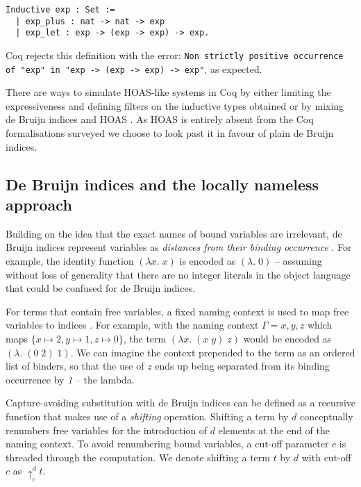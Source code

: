 \documentclass[]{unswthesis}
\begin{document}
\begin{verbatim}
Inductive exp : Set :=
  | exp_plus : nat -> nat -> exp
  | exp_let : exp -> (exp -> exp) -> exp.
\end{verbatim}

Coq rejects this definition with the error: \texttt{Non strictly positive occurrence of "exp" in
 "exp -> (exp -> exp) -> exp"}, as expected.
 
There are ways to simulate HOAS-like systems in Coq by either limiting the expressiveness and defining filters on the inductive types obtained \cite{despeyroux95} or by mixing de Bruijn indices and HOAS \cite{capretta07}. As HOAS is entirely absent from the Coq formalisations surveyed we choose to look past it in favour of plain de Bruijn indices.

\subsection{De Bruijn indices and the locally nameless approach}
\label{sec:de_bruijn}

Building on the idea that the exact names of bound variables are irrelevant, de Bruijn indices represent variables as \textit{distances from their binding occurrence} \cite{deBruijn72}. For example, the identity function $(\lambda x. \; x)$ is encoded as $(\lambda . \; 0)$ -- assuming without loss of generality that there are no integer literals in the object language that could be confused for de Bruijn indices.

For terms that contain free variables, a fixed naming context is used to map free variables to indices \cite{tapl}. For example, with the naming context $\Gamma = x, y, z$ which maps $\{x \mapsto 2, y \mapsto 1, z \mapsto 0\}$, the term $(\lambda x. \; (x \; y) \; z)$ would be encoded as $(\lambda. \; (0 \; 2) \; 1)$. We can imagine the context prepended to the term as an ordered list of binders, so that the use of $z$ ends up being separated from its binding occurrence by \textit{1} -- the lambda.

Capture-avoiding substitution with de Bruijn indices can be defined as a recursive function that makes use of a \textit{shifting} operation. Shifting a term by $d$ conceptually renumbers free variables for the introduction of $d$ elements at the end of the naming context. To avoid renumbering bound variables, a cut-off parameter $c$ is threaded through the computation. We denote shifting a term $t$ by $d$ with cut-off $c$ as $\uparrow^d_c t$.
\end{document}
